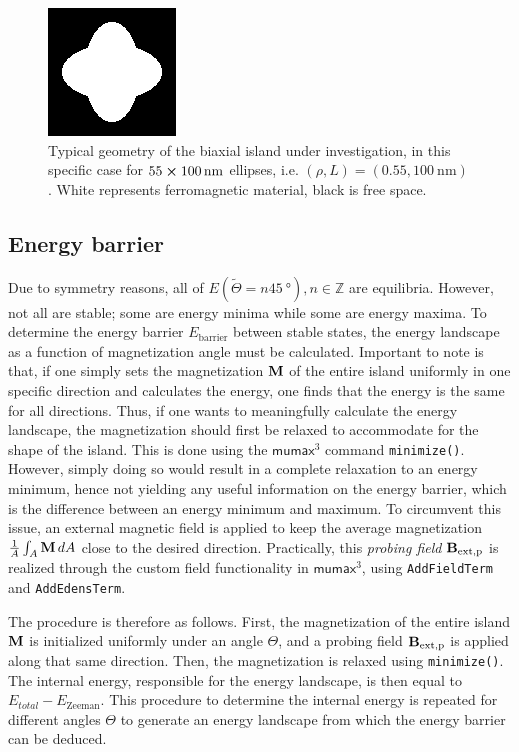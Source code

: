 \documentclass[11pt,a4paper,english]{article}
\newcommand{\code}[1]{\texttt{#1}}
\newcommand{\mumax}{$\mathsf{mumax}^3$}
\begin{document}
\begin{figure}
    \centering
    \includegraphics[width=0.3\columnwidth]{Figures/biaxial_island/Geometry/geomPlus55.png}
    \caption{Typical geometry of the biaxial island under investigation, in this specific case for $55\cross\SI{100}{\nano\metre}$ ellipses, i.e. $(\rho, L)=(0.55, \SI{100}{\nano\metre})$. White represents ferromagnetic material, black is free space.}
    \label{fig:biaxial_island:geometryTypical}
\end{figure}

\subsection{Energy barrier}
\label{par:Biaxial_EnergyBarrier}
Due to symmetry reasons, all of $E(\widetilde{\Theta} = n\SI{45}{\degree}), n\in\mathbb{Z}$ are equilibria. However, not all are stable; some are energy minima while some are energy maxima. To determine the energy barrier $E_\mathrm{barrier}$ between stable states, the energy landscape as a function of magnetization angle must be calculated. Important to note is that, if one simply sets the magnetization $\vb{M}$ of the entire island uniformly in one specific direction and calculates the energy, one finds that the energy is the same for all directions. Thus, if one wants to meaningfully calculate the energy landscape, the magnetization should first be relaxed to accommodate for the shape of the island. This is done using the \mumax{} command \code{minimize()}. However, simply doing so would result in a complete relaxation to an energy minimum, hence not yielding any useful information on the energy barrier, which is the difference between an energy minimum and maximum. To circumvent this issue, an external magnetic field is applied to keep the average magnetization $\frac{1}{A}\int_A \vb{M}\,dA$ close to the desired direction. Practically, this \textit{probing field} $\vb{B_\mathrm{ext,p}}$ is realized through the custom field functionality in \mumax{}, using \code{AddFieldTerm} and \code{AddEdensTerm}. \par
The procedure is therefore as follows. First, the magnetization of the entire island $\vb{M}$ is initialized uniformly under an angle $\Theta$, and a probing field $\vb{B_\mathrm{ext,p}}$ is applied along that same direction. Then, the magnetization is relaxed using \code{minimize()}. The internal energy, responsible for the energy landscape, is then equal to $E_{total} - E_\mathrm{Zeeman}$. This procedure to determine the internal energy is repeated for different angles $\Theta$ to generate an energy landscape from which the energy barrier can be deduced.
\end{document}
